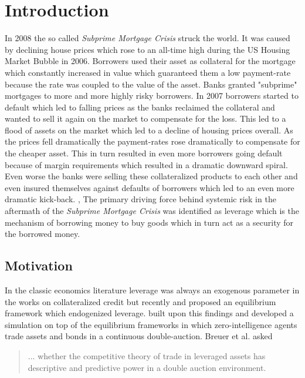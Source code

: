 \documentclass[Bachelorarbeit.tex]{subfiles}
\begin{document}
\chapter{Introduction}
In 2008 the so called \textit{Subprime Mortgage Crisis} struck the world. It was caused by declining house prices which rose to an all-time high during the US Housing Market Bubble in 2006. Borrowers used their asset as collateral for the mortgage which constantly increased in value which guaranteed them a low payment-rate because the rate was coupled to the value of the asset. Banks granted "subprime" mortgages to more and more highly risky borrowers. In 2007 borrowers started to default which led to falling prices as the banks reclaimed the collateral and wanted to sell it again on the market to compensate for the loss. This led to a flood of assets on the market which led to a decline of housing prices overall. As the prices fell dramatically the payment-rates rose dramatically to compensate for the cheaper asset. This in turn resulted in even more borrowers going default because of margin requirements which resulted in a dramatic downward spiral. Even worse the banks were selling these collateralized products to each other and even insured themselves against defaults of borrowers which led to an even more dramatic kick-back. \cite{SubprimeExplainedA}, \cite{SubprimeExplainedB}
\medskip
The primary driving force behind systemic risk in the aftermath of the \textit{Subprime Mortgage Crisis} was identified as leverage which is the mechanism of borrowing money to buy goods which in turn act as a security for the borrowed money.

\section{Motivation}
In the classic economics literature leverage was always an exogenous parameter in the works on collateralized credit but recently \cite{Geanakoplos2009} and \cite{GeanakoplosZame2014} proposed an equilibrium framework which endogenized leverage. \cite{Breuer2015} built upon this findings and developed a simulation on top of the equilibrium frameworks in which zero-intelligence agents trade assets and bonds in a continuous double-auction. Breuer et al. asked 

\begin{quote}
... whether the competitive theory of trade in leveraged assets has descriptive and predictive power in a double auction environment.
\end{quote}
\end{document}
